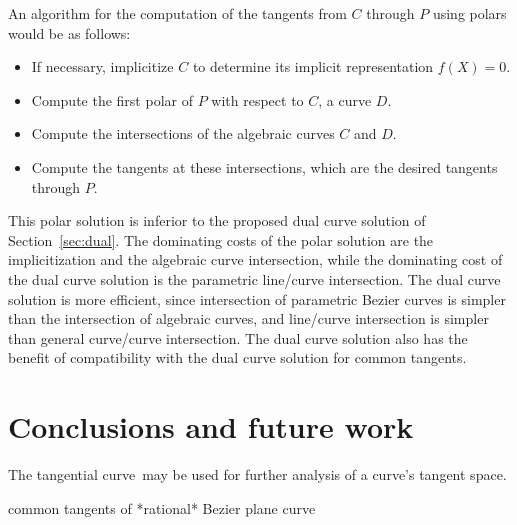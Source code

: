 \documentclass[11pt]{article}
\newcommand{\tang}{tangential curve\ }
\begin{document}
An algorithm for the computation of the tangents from $C$ through $P$
using polars would be as follows:
\begin{itemize}
\item	If necessary, implicitize $C$ to determine its implicit representation $f(X)=0$.
\item	Compute the first polar of $P$ with respect to $C$, a curve $D$.
\item	Compute the intersections of the algebraic curves $C$ and $D$.
\item	Compute the tangents at these intersections, which are the desired
	tangents through $P$.
\end{itemize}

This polar solution is inferior to the proposed dual curve solution of 
Section~\ref{sec:dual}.
The dominating costs of the polar solution
are the implicitization and the algebraic curve intersection,
while the dominating cost of the dual curve solution is
the parametric line/curve intersection.
The dual curve solution is more efficient, since 
intersection of parametric Bezier curves is simpler than 
the intersection of algebraic curves,
and line/curve intersection is simpler than general curve/curve intersection.
The dual curve solution also has the benefit of compatibility with
the dual curve solution for common tangents.

\section{Conclusions and future work}
\label{sec:conclude}

The \tang may be used for further analysis of a curve's tangent space.

common tangents of *rational* Bezier plane curve

\clearpage
\end{document}
